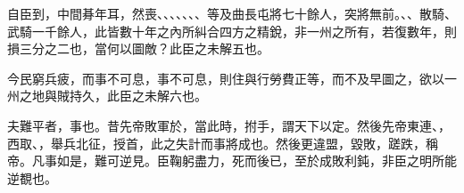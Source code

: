自臣到，中間朞年耳，然喪、、、、、、、等及曲長屯將七十餘人，突將無前。、、散騎、武騎一千餘人，此皆數十年之內所糾合四方之精銳，非一州之所有，若復數年，則損三分之二也，當何以圖敵？此臣之未解五也。

今民窮兵疲，而事不可息，事不可息，則住與行勞費正等，而不及早圖之，欲以一州之地與賊持久，此臣之未解六也。

夫難平者，事也。昔先帝敗軍於，當此時，拊手，謂天下以定。然後先帝東連、，西取、，舉兵北征，授首，此之失計而事將成也。然後更違盟，毀敗，蹉跌，稱帝。凡事如是，難可逆見。臣鞠躬盡力，死而後已，至於成敗利鈍，非臣之明所能逆覩也。

\theendnotes

